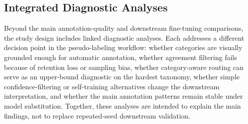 \documentclass{ieeeaccess}
\begin{document}
\begin{table}[!t]
\caption{Seed policy by analysis module.
Main-matrix LP uses repeated-seed evaluation; targeted LoRA
replication is reported for BowTurnHead and TeacherBehavior under None
and GT; auxiliary diagnostics and the remaining LoRA reference cells
remain protocol-matched single-run/fixed-seed analyses.}
\label{tab:seed_policy}
\centering
{}
\end{table}

\subsection{Integrated Diagnostic Analyses}
\label{sec:additional_experiments}

Beyond the main annotation-quality and downstream fine-tuning
comparisons, the study design includes linked diagnostic analyses.
Each addresses a different decision point in the pseudo-labeling
workflow: whether categories are visually grounded enough for automatic
annotation, whether agreement filtering fails because of retention loss
or sampling bias, whether category-aware routing can serve as an
upper-bound diagnostic on the hardest taxonomy, whether simple
confidence-filtering or self-training alternatives change the
downstream interpretation, and whether the main annotation patterns
remain stable under model substitution.
Together, these analyses are intended to explain the main findings,
not to replace repeated-seed downstream validation.
\end{document}

